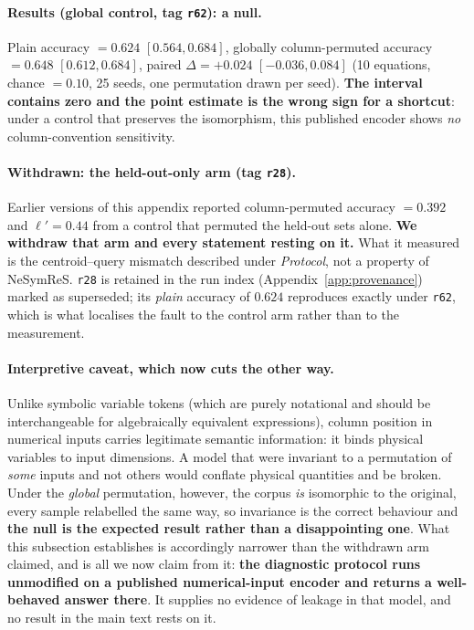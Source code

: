 \paragraph{Results (global control, tag \texttt{r62}): a null.} Plain accuracy $= 0.624$ $[0.564, 0.684]$, globally column-permuted accuracy $= 0.648$ $[0.612, 0.684]$, paired $\Delta = +0.024$ $[-0.036, 0.084]$ (10 equations, chance $= 0.10$, 25 seeds, one permutation drawn per seed). \textbf{The interval contains zero and the point estimate is the wrong sign for a shortcut}: under a control that preserves the isomorphism, this published encoder shows \emph{no} column-convention sensitivity.

\paragraph{Withdrawn: the held-out-only arm (tag \texttt{r28}).} Earlier versions of this appendix reported column-permuted accuracy $= 0.392$ and $\ell' = 0.44$ from a control that permuted the held-out sets alone. \textbf{We withdraw that arm and every statement resting on it.} What it measured is the centroid--query mismatch described under \emph{Protocol}, not a property of NeSymReS. \texttt{r28} is retained in the run index (Appendix~\ref{app:provenance}) marked as superseded; its \emph{plain} accuracy of $0.624$ reproduces exactly under \texttt{r62}, which is what localises the fault to the control arm rather than to the measurement.

\paragraph{Interpretive caveat, which now cuts the other way.} Unlike symbolic variable tokens (which are purely notational and should be interchangeable for algebraically equivalent expressions), column position in numerical inputs carries legitimate semantic information: it binds physical variables to input dimensions.  A model that were invariant to a permutation of \emph{some} inputs and not others would conflate physical quantities and be broken.  Under the \emph{global} permutation, however, the corpus \emph{is} isomorphic to the original, every sample relabelled the same way, so invariance is the correct behaviour and \textbf{the null is the expected result rather than a disappointing one}.  What this subsection establishes is accordingly narrower than the withdrawn arm claimed, and is all we now claim from it: \textbf{the diagnostic protocol runs unmodified on a published numerical-input encoder and returns a well-behaved answer there}.  It supplies no evidence of leakage in that model, and no result in the main text rests on it.

